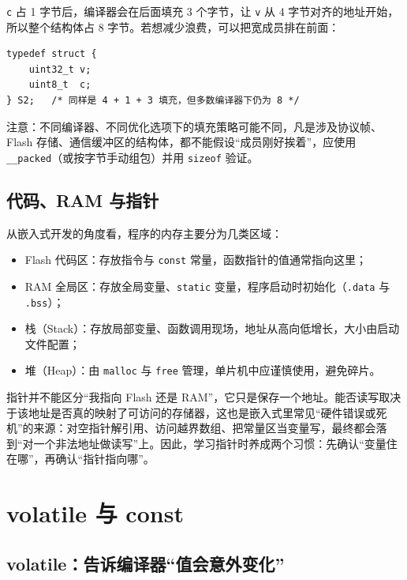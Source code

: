 \texttt{c} 占 1 字节后，编译器会在后面填充 3 个字节，让 \texttt{v} 从 4 字节对齐的地址开始，所以整个结构体占 8 字节。若想减少浪费，可以把宽成员排在前面：

\begin{lstlisting}[style=c]
typedef struct {
    uint32_t v;
    uint8_t  c;
} S2;   /* 同样是 4 + 1 + 3 填充，但多数编译器下仍为 8 */
\end{lstlisting}

注意：不同编译器、不同优化选项下的填充策略可能不同，凡是涉及协议帧、Flash 存储、通信缓冲区的结构体，都不能假设“成员刚好挨着”，应使用 \texttt{\_\_packed}（或按字节手动组包）并用 \texttt{sizeof} 验证。

\subsection{代码、RAM 与指针}

从嵌入式开发的角度看，程序的内存主要分为几类区域：

\begin{itemize}
\item Flash 代码区：存放指令与 \texttt{const} 常量，函数指针的值通常指向这里；
\item RAM 全局区：存放全局变量、\texttt{static} 变量，程序启动时初始化（\texttt{.data} 与 \texttt{.bss}）；
\item 栈（Stack）：存放局部变量、函数调用现场，地址从高向低增长，大小由启动文件配置；
\item 堆（Heap）：由 \texttt{malloc} 与 \texttt{free} 管理，单片机中应谨慎使用，避免碎片。
\end{itemize}

指针并不能区分“我指向 Flash 还是 RAM”，它只是保存一个地址。能否读写取决于该地址是否真的映射了可访问的存储器，这也是嵌入式里常见“硬件错误或死机”的来源：对空指针解引用、访问越界数组、把常量区当变量写，最终都会落到“对一个非法地址做读写”上。因此，学习指针时养成两个习惯：先确认“变量住在哪”，再确认“指针指向哪”。

\section{volatile 与 const} \label{sec:volatile-const}

\subsection{volatile：告诉编译器“值会意外变化”}

